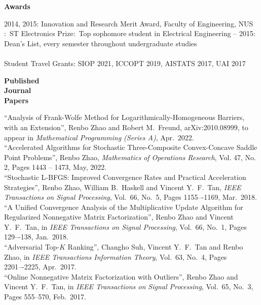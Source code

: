 \documentclass[11pt]{article}
\newcommand{\TSP}{IEEE Transactions on Signal Processing}
\newcommand{\TIT}{IEEE Transactions Information Theory}
\newcommand{\MOR}{Mathematics of Operations Research}
\newcommand{\MPA}{Mathematical Programming (Series A)}
\begin{document}



\begin{minipage}[t]{0.18\textwidth}
\textbf{Awards}
\end{minipage}
\begin{minipage}[t]{0.8\textwidth}
2014, 2015: Innovation and Research Merit Award, Faculty of Engineering, NUS \newline{}:\ ST Electronics Prize:\ Top sophomore student in Electrical Engineering\newline{} -- 2015: Dean's List, every semester throughout undergraduate studies\\\\ %
Student Travel Grants: SIOP 2021, ICCOPT 2019, AISTATS 2017, UAI 2017  \newline\newline
\end{minipage} 






\begin{minipage}[t]{0.18\textwidth}
\textbf{Published\\ Journal \\Papers}
\end{minipage}
\begin{minipage}[t]{0.8\textwidth}
``Analysis of Frank-Wolfe Method for Logarithmically-Homogeneous Barriers, with an Extension'', Renbo Zhao and Robert M.\ Freund, arXiv:2010.08999, to appear in {\em \MPA}, Apr.\ 2022.\\[.2cm]
``Accelerated Algorithms for Stochastic Three-Composite Convex-Concave Saddle Point Problems'', {Renbo Zhao}, %
{\em \MOR}, Vol. 47, No. 2, Pages 1443 – 1473, May, 2022.\\[.2cm]
``Stochastic L-BFGS: Improved Convergence Rates and Practical Acceleration Strategies'', {Renbo Zhao}, William B.\ Haskell and Vincent Y.\ F.\ Tan,   {\em \TSP}, Vol.\ 66, No.\ 5, Pages 1155–-1169, Mar.\ 2018. %
\\[.2cm]
``A Unified Convergence Analysis of the Multiplicative Update Algorithm for Regularized Nonnegative Matrix Factorization'', {Renbo Zhao} and Vincent Y.\ F.\ Tan,  in {\em \TSP}, Vol.\ 66, No.\ 1, Pages 129–-138, Jan.\  2018. %
\\[.2cm]
``Adversarial Top-$K$ Ranking'', Changho Suh, Vincent Y.\ F.\ Tan and {Renbo Zhao},   in {\em \TIT}, Vol.\ 63, No.\ 4, Pages 2201–-2225, Apr.\ 2017. %
\\[.2cm]
``Online Nonnegative Matrix Factorization with Outliers'', {Renbo Zhao} and Vincent Y.\ F.\ Tan,  in {\em \TSP}, Vol.\ 65, No.\ 3, Pages 555--570, Feb.\ 2017. %
\\%
\end{minipage}
\end{document}
